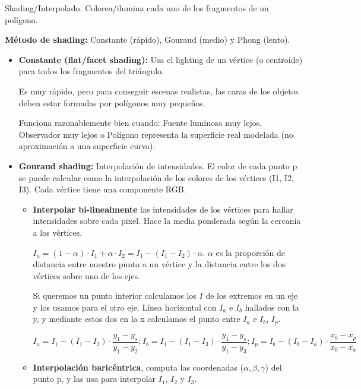\begin{enumerate}
	      Shading/Interpolado. Colorea/ilumina cada uno de los fragmentos de un polígono.
	      
	      \textbf{Método de shading:} Constante (rápido), Gouraud (medio) y Phong (lento).
	      \begin{itemize}
		      \item \textbf{Constante (flat/facet shading):} Usa el lighting de un vértice (o centroide) para todos los fragmentos del triángulo.
		            
		            Es muy rápido, pero para conseguir escenas realistas, las caras de los objetos deben estar formadas por polígonos muy pequeños.
		            
		            Funciona razonablemente bien cuando: Fuente luminosa muy lejos, Observador muy lejos o Polígono representa la superficie real modelada (no aproximación a una superficie curva).
		      \item \textbf{Gouraud shading:} Interpolación de intensidades. El color de cada punto p se puede calcular como la interpolación de los colores de los vértices (I1, I2, I3). Cada vértice tiene una componente RGB.
		            \begin{itemize}
			            \item \textbf{Interpolar bi-linealmente} las intensidades de los vértices para hallar intensidades sobre cada pixel. Hace la media ponderada según la cercanía a los vértices.
			                  
			                  $I_a = (1-\alpha) \cdot I_1 + \alpha \cdot I_2 = I_1 - (I_1 - I_2) \cdot \alpha$. $\alpha$ es la proporción de distancia entre nuestro punto a un vértice y la distancia entre los dos vértices sobre uno de los ejes.
			                  
			                  Si queremos un punto interior calculamos los $I$ de los extremos en un eje y los usamos para el otro eje. Línea horizontal con $I_a$ e $I_b$ hallados con la y, y mediante estos dos en la x calculamos el punto entre $I_a$ e $I_b$, $I_p$.
			                  
			                  $$I_a =  I_1 - (I_1 - I_2) \cdot \frac{y_1-y_s}{y_1 - y_2};
				                  I_b =  I_1 - (I_1 - I_3) \cdot \frac{y_1-y_s}{y_1 - y_3};
				                  I_p =  I_b - (I_b - I_a) \cdot \frac{x_b - x_p}{x_b-x_a}$$
			                  
			            \item\textbf{Interpolación baricéntrica}, computa las coordenadas ($\alpha, \beta, \gamma$) del punto p, y las usa para interpolar $I_1$, $I_2$ y $I_3$.
			                  

\end{itemize}
\end{itemize}
\end{enumerate}
